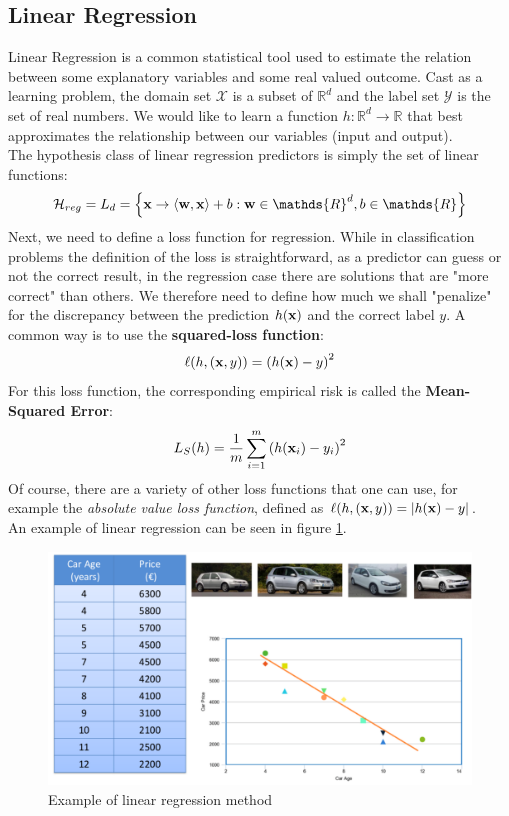 \documentclass[12pt]{report}
\theoremstyle{plain}
\newcommand\mcl[1]{\mathcal{#1}}
\newcommand\sprod[2]{\langle \vb{#1},\vb{#2}\rangle}
\begin{document}
\begin{flushleft}
\section{Linear Regression}
Linear Regression is a common statistical tool used to estimate the relation 
between some explanatory variables and some real valued outcome. Cast as a 
learning problem, the domain set $\mcl{X}$ is a subset of $\mathds{R}^d$ and 
the label set $\mcl{Y}$ is the set of real numbers. We would like to learn a 
function $h:\mathds{R}^d\to\mathds{R}$ that best approximates the relationship 
between our variables (input and output).\\
The hypothesis class of linear regression predictors is simply the set of 
linear functions:
\[ 
\mcl{H}_{reg}=L_d=\left\{\vb{x}\to\sprod{w}{x}+b:\vb{w}\in\mathds{R}^d, 
b\in\mathds{R}
 \right\} \]
Next, we need to define a loss function for regression. While in classification 
problems the definition of the loss is straightforward, as a predictor 
can guess or not the correct result, in the regression case there are solutions 
that are "more correct" than others. We therefore need to define how much we 
shall "penalize" for the discrepancy between the prediction $h(\vb{x})$ and the 
correct label $y$. A common way is to use the \textbf{squared-loss function}:
\[ \ell(h,(\vb{x},y)) = \left(h(\vb{x})-y\right)^2 \]
For this loss function, the corresponding empirical risk is called the 
\textbf{Mean-Squared Error}:
\begin{equation}
L_S(h)=\frac{1}{m}\sum_{i=1}^m \left(h(\vb{x}_i)-y_i\right)^2
\label{eq:mean_squared_err}
\end{equation}
Of course, there are a variety of other loss functions that one can use, for 
example the \textit{absolute value loss function}, defined as 
$\ell(h,(\vb{x},y)) = \abs{h(\vb{x})-y}$.\\
An example of linear regression can be seen in figure \ref{fig:ex_lin_regr}.
\begin{figure}
	\centering
	\includegraphics[scale=0.5]{images/linregress_example.pdf}
	\caption{Example of linear regression method}
	\label{fig:ex_lin_regr}
\end{figure}



\end{flushleft}
\end{document}
